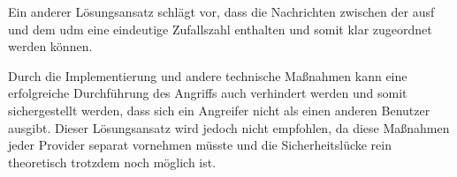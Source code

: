 Ein anderer Lösungsansatz schlägt vor, dass die Nachrichten zwischen der \gls{ausf} und dem \gls{udm} eine eindeutige Zufallszahl enthalten und somit klar zugeordnet werden können.

Durch die Implementierung und andere technische Maßnahmen kann eine erfolgreiche Durchführung des Angriffs auch verhindert werden und somit sichergestellt werden, dass sich ein Angreifer nicht als einen anderen Benutzer ausgibt.
Dieser Lösungsansatz wird jedoch nicht empfohlen, da diese Maßnahmen jeder Provider separat vornehmen müsste und die Sicherheitslücke rein theoretisch trotzdem noch möglich ist.





